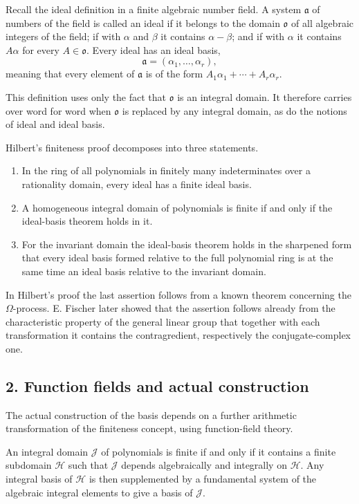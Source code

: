 \documentclass[12pt]{article}
\begin{document}
Recall the ideal definition in a finite algebraic number field. A system $\mathfrak a$ of numbers of the field is called an ideal if it belongs to the domain $\mathfrak o$ of all algebraic integers of the field; if with $\alpha$ and $\beta$ it contains $\alpha-\beta$; and if with $\alpha$ it contains $A\alpha$ for every $A\in\mathfrak o$. Every ideal has an ideal basis,
\[
  \mathfrak a=(\alpha_1,\ldots,\alpha_r),
\]
meaning that every element of $\mathfrak a$ is of the form $A_1\alpha_1+\cdots+A_r\alpha_r$.

This definition uses only the fact that $\mathfrak o$ is an integral domain. It therefore carries over word for word when $\mathfrak o$ is replaced by any integral domain, as do the notions of ideal and ideal basis.

Hilbert's finiteness proof decomposes into three statements.
\begin{enumerate}
  \item In the ring of all polynomials in finitely many indeterminates over a rationality domain, every ideal has a finite ideal basis.
  \item A homogeneous integral domain of polynomials is finite if and only if the ideal-basis theorem holds in it.
  \item For the invariant domain the ideal-basis theorem holds in the sharpened form that every ideal basis formed relative to the full polynomial ring is at the same time an ideal basis relative to the invariant domain.
\end{enumerate}
In Hilbert's proof the last assertion follows from a known theorem concerning the $\Omega$-process. E. Fischer later showed that the assertion follows already from the characteristic property of the general linear group that together with each transformation it contains the contragredient, respectively the conjugate-complex one.

\subsection{2. Function fields and actual construction}

The actual construction of the basis depends on a further arithmetic transformation of the finiteness concept, using function-field theory.

An integral domain $\mathcal J$ of polynomials is finite if and only if it contains a finite subdomain $\mathcal H$ such that $\mathcal J$ depends algebraically and integrally on $\mathcal H$. Any integral basis of $\mathcal H$ is then supplemented by a fundamental system of the algebraic integral elements to give a basis of $\mathcal J$.
\end{document}
